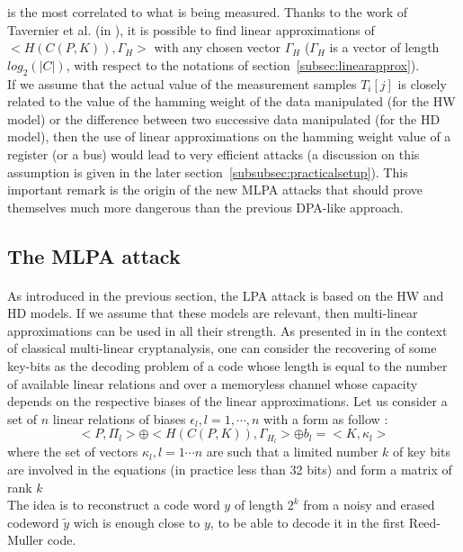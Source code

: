 \documentclass[11pt,a4paper]{article}
\begin{document}
{{{{{{{{{is the most correlated to what is being measured.
Thanks to the work of Tavernier et al. (in \cite{TavernierToBePublished}), it is possible to find linear approximations of $<H(C(P,K)), \Gamma_H>$ with 
any chosen vector $\Gamma_H$ ($\Gamma_H$ is a vector of length $log_2(|C|)$, with respect to the notations of section~\ref{subsec:linearapprox}). \\
If we assume that the actual value of the measurement samples $T_i[j]$ is closely related to the value of the hamming weight of the data 
manipulated (for the HW model) or the difference between two successive data manipulated (for the HD model), 
then the use of linear approximations on the hamming weight value of a register (or a bus) would lead to very efficient attacks (a discussion on this assumption is 
given in the later section~\ref{subsubsec:practicalsetup}). 
This important remark is the origin of the new MLPA attacks that should prove themselves much more dangerous than the previous DPA-like approach.

\subsection{The MLPA attack}
\paragraph{}
As introduced in the previous section, the LPA attack is based on the HW and HD models. If we assume that these models are relevant, then multi-linear approximations
can be used in all their strength. As presented in \cite{GerardTillich07, TavernierToBePublished} in the context of classical multi-linear cryptanalysis, one can consider the recovering 
of some key-bits as the decoding problem of a code whose length is equal to the number of available linear relations and over a memoryless channel whose capacity 
depends on the respective biases of the linear approximations. 
Let us consider a set of $n$ linear relations of biases $\epsilon_l, l=1,\cdots, n$ with a form as follow : 
\begin{equation} \label{equa:linearapprox_H}
  <P,\Pi_l> \oplus <H(C(P,K)), \Gamma_{H_l}> \oplus b_l = <K,\kappa_l>
\end{equation}
where the set of vectors $\kappa_l, l=1\cdots n$ are such that a limited number $k$ of key bits are involved in the equations (in practice less than 32 bits) and form a matrix of rank 
$k$ \\
The idea is to reconstruct a code word $y$ of length $2^k$ from a noisy and erased codeword $\tilde{y}$ wich is enough close to $y$, to be able to decode it in the first Reed-Muller code. 

}}}}}}}}}
\end{document}
